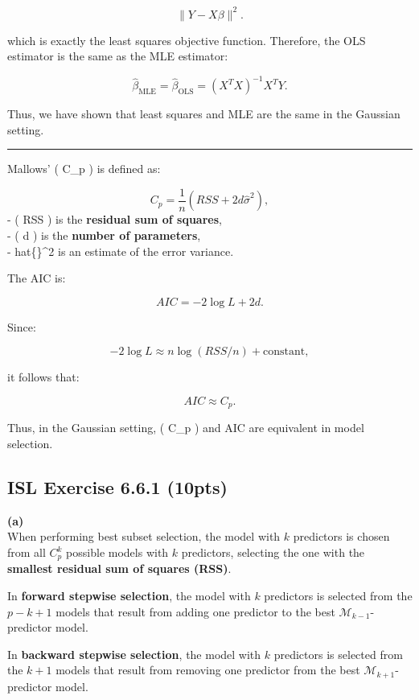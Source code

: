 \documentclass[
  letterpaper,
  DIV=11,
  numbers=noendperiod]{scrartcl}
\begin{document}
\[
\| Y - X\beta \|^2.
\]

which is exactly the least squares objective function. Therefore, the
OLS estimator is the same as the MLE estimator:

\[
\hat{\beta}_{\text{MLE}} = \hat{\beta}_{\text{OLS}} = (X^T X)^{-1} X^T Y.
\]

Thus, we have shown that least squares and MLE are the same in the
Gaussian setting.

\begin{center}\rule{0.5\linewidth}{0.5pt}\end{center}

Mallows' ( C\_p ) is defined as:

\[
C_p = \frac{1}{n} (RSS + 2d\hat{\sigma}^2),
\] - ( RSS ) is the \textbf{residual sum of squares},\\
- ( d ) is the \textbf{number of parameters},\\
- hat\{\sigma\}\^{}2 is an estimate of the error variance.

The AIC is:

\[
AIC = -2 \log L + 2d.
\]

Since:

\[
-2 \log L \approx n \log (RSS/n) + \text{constant},
\]

it follows that:

\[
AIC \approx C_p.
\]

Thus, in the Gaussian setting, ( C\_p ) and AIC are equivalent in model
selection.

\subsection{ISL Exercise 6.6.1 (10pts)}\label{isl-exercise-6.6.1-10pts}

\textbf{(a)}\\
When performing best subset selection, the model with \(k\) predictors
is chosen from all \(C_p^k\) possible models with \(k\) predictors,
selecting the one with the \textbf{smallest residual sum of squares
(RSS)}.

In \textbf{forward stepwise selection}, the model with \(k\) predictors
is selected from the \(p - k + 1\) models that result from adding one
predictor to the best \(\mathcal{M}_{k - 1}\)-predictor model.

In \textbf{backward stepwise selection}, the model with \(k\) predictors
is selected from the \(k + 1\) models that result from removing one
predictor from the best \(\mathcal{M}_{k + 1}\)-predictor model.
\end{document}
